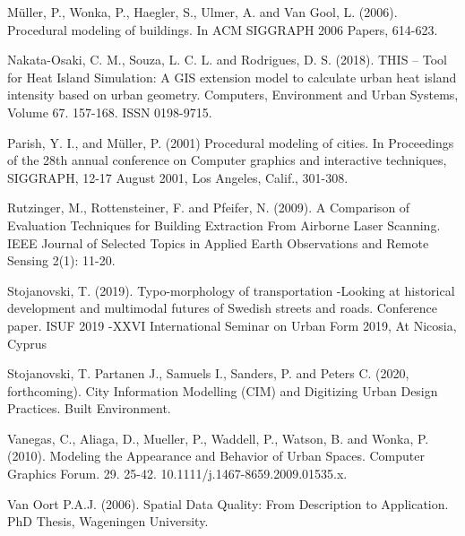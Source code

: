 \documentclass{kththesis}
\begin{document}
\begin{thebibliography}{9}
Müller, P., Wonka, P., Haegler, S., Ulmer, A. and Van Gool, L. (2006). Procedural modeling of buildings. In ACM SIGGRAPH 2006 Papers, 614-623.

Nakata-Osaki, C. M., Souza, L. C. L. and Rodrigues, D. S. (2018). THIS – Tool for Heat Island Simulation: A GIS extension model to calculate urban heat island intensity based on urban geometry. Computers, Environment and Urban Systems, Volume 67. 157-168. ISSN 0198-9715.

Parish, Y. I., and Müller, P. (2001) Procedural modeling of cities. In Proceedings of the 28th annual conference on Computer graphics and interactive techniques, SIGGRAPH, 12-17 August 2001, Los Angeles, Calif., 301-308.

Rutzinger, M., Rottensteiner, F. and Pfeifer, N. (2009). A Comparison of Evaluation Techniques for Building Extraction From Airborne Laser Scanning. IEEE Journal of Selected Topics in Applied Earth Observations and Remote Sensing 2(1): 11-20.

Stojanovski, T. (2019). Typo-morphology of transportation -Looking at historical development and multimodal futures of Swedish streets and roads. Conference paper. ISUF 2019 -XXVI International Seminar on Urban Form 2019, At Nicosia, Cyprus

Stojanovski, T. Partanen J., Samuels I., Sanders, P. and Peters C. (2020, forthcoming). City Information Modelling (CIM) and Digitizing Urban Design Practices. Built Environment.

Vanegas, C., Aliaga, D., Mueller, P., Waddell, P., Watson, B. and Wonka, P. (2010). Modeling the Appearance and Behavior of Urban Spaces. Computer Graphics Forum. 29. 25-42. 10.1111/j.1467-8659.2009.01535.x. 

Van Oort P.A.J. (2006). Spatial Data Quality: From Description to Application. PhD Thesis, Wageningen University.

\end{thebibliography}

\appendix

\tailmatter
\end{document}
